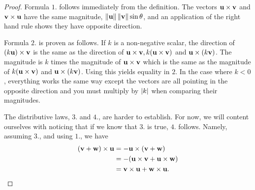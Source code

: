 \begin{proof}
  Formula $1$. follows immediately from the definition. The vectors
  $\mbox{\bf u}\times \mbox{\bf v}$ and $\mbox{\bf v}\times \mbox{\bf u}$ have the
  same magnitude, $\left\|\mbox{\bf u}\right\|\left\|\mbox{\bf v}\right\|\sin \theta$, and an
  application of the right hand rule shows they have opposite
  direction.

  Formula $2$. is proven as follows. If $k $ is a non-negative scalar,
  the direction of $(k \mbox{\bf u}) \times \mbox{\bf v}$ is the same as
  the direction of
  $\mbox{\bf u}\times \mbox{\bf v}, k (\mbox{\bf u}\times \mbox{\bf v}) $ and
  $\mbox{\bf u}\times (k \mbox{\bf v})$. The magnitude is $k$ times the
  magnitude of $\mbox{\bf u}\times \mbox{\bf v}$ which is the same as the
  magnitude of $k (\mbox{\bf u}\times \mbox{\bf v}) $ and
  $\mbox{\bf u}\times (k \mbox{\bf v})$. Using this yields equality in
  $2$. In the case where $k <0$, everything works the same way except
  the vectors are all pointing in the opposite direction and you must
  multiply by $\left|k \right|$ when comparing their magnitudes.

  The distributive laws, $3$. and $4$., are harder to establish. For
  now, we will content ourselves with noticing that if we know that
  $3$. is true, $4$. follows. Namely, assuming $3$., and using $1$.,
  we have
  \begin{align*}
    (\mbox{\bf v}+\mbox{\bf w}) \times \mbox{\bf u}
    & =-\mbox{\bf u}\times (
      \mbox{\bf v}+\mbox{\bf w}) \\
    & =-(\mbox{\bf u}\times \mbox{\bf v}+\mbox{\bf u}\times \mbox{\bf w}) \\
    & =\mbox{\bf v}\times \mbox{\bf u}+\mbox{\bf w}\times \mbox{\bf u}.
  \end{align*}
\end{proof}

